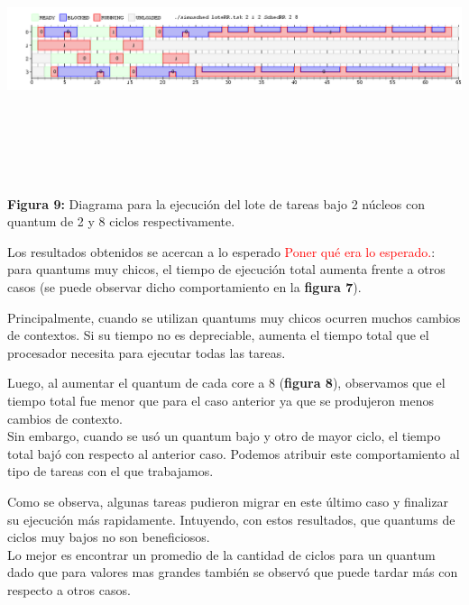 \documentclass[a4paper]{article}
\begin{document}
 \includegraphics[width=\textwidth,height=3.0in,keepaspectratio]{imagenes/ej4/eje3.png} \\
\begin {flushleft}
\textbf{Figura 9:} Diagrama para la ejecuci\'on del lote de tareas bajo 2 n\'ucleos con quantum de 2 y 8 ciclos respectivamente.
\end{flushleft}

\newpage


Los resultados obtenidos se acercan a lo esperado \textcolor{red}{Poner qu\'e era lo esperado.}: para quantums muy chicos, el tiempo de ejecución total aumenta frente a otros casos (se puede observar dicho comportamiento en la\textbf{ figura 7}).

 Principalmente, cuando se utilizan quantums muy chicos ocurren muchos cambios de contextos. Si su tiempo no es depreciable, aumenta el tiempo total que el procesador necesita para ejecutar todas las tareas. 
 
 Luego, al aumentar el quantum de cada core a 8 (\textbf{figura 8}), observamos que el tiempo total fue menor que para el caso anterior ya que se produjeron menos cambios de contexto. \\
 
 Sin embargo, cuando se usó un quantum bajo y otro de mayor ciclo, el tiempo total bajó con respecto al anterior caso. Podemos atribuir este comportamiento al tipo de tareas con el que trabajamos. 
 
 Como se observa, algunas tareas pudieron migrar en este último caso y finalizar su ejecución más rapidamente. Intuyendo, con estos resultados, que quantums de ciclos muy bajos no son beneficiosos.\\
 
 
  Lo mejor es encontrar un promedio de la cantidad de ciclos para un quantum dado que para valores mas grandes también se observó que puede tardar más con respecto a otros casos.   \\
 
\end{document}
